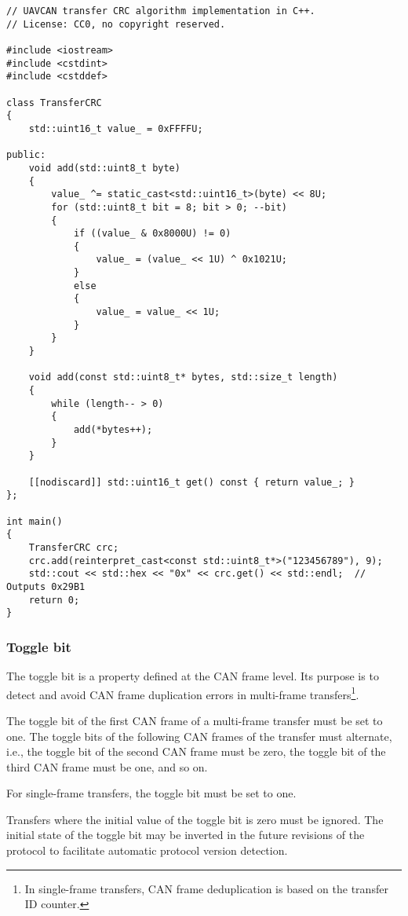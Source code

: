 \begin{minipage}{0.9\textwidth}
\begin{verbatim}
// UAVCAN transfer CRC algorithm implementation in C++.
// License: CC0, no copyright reserved.

#include <iostream>
#include <cstdint>
#include <cstddef>

class TransferCRC
{
    std::uint16_t value_ = 0xFFFFU;

public:
    void add(std::uint8_t byte)
    {
        value_ ^= static_cast<std::uint16_t>(byte) << 8U;
        for (std::uint8_t bit = 8; bit > 0; --bit)
        {
            if ((value_ & 0x8000U) != 0)
            {
                value_ = (value_ << 1U) ^ 0x1021U;
            }
            else
            {
                value_ = value_ << 1U;
            }
        }
    }

    void add(const std::uint8_t* bytes, std::size_t length)
    {
        while (length-- > 0)
        {
            add(*bytes++);
        }
    }

    [[nodiscard]] std::uint16_t get() const { return value_; }
};

int main()
{
    TransferCRC crc;
    crc.add(reinterpret_cast<const std::uint8_t*>("123456789"), 9);
    std::cout << std::hex << "0x" << crc.get() << std::endl;  // Outputs 0x29B1
    return 0;
}
\end{verbatim}
\end{minipage}

\subsubsection{Toggle bit}

The toggle bit is a property defined at the CAN frame level.
Its purpose is to detect and avoid CAN frame duplication errors in multi-frame
transfers\footnote{In single-frame transfers, CAN frame deduplication is based on the transfer ID counter.}.

The toggle bit of the first CAN frame of a multi-frame transfer must be set to one.
The toggle bits of the following CAN frames of the transfer must alternate,
i.e., the toggle bit of the second CAN frame must be zero,
the toggle bit of the third CAN frame must be one, and so on.

For single-frame transfers, the toggle bit must be set to one.

Transfers where the initial value of the toggle bit is zero must be ignored.
The initial state of the toggle bit may be inverted in the future revisions of the protocol
to facilitate automatic protocol version detection.

